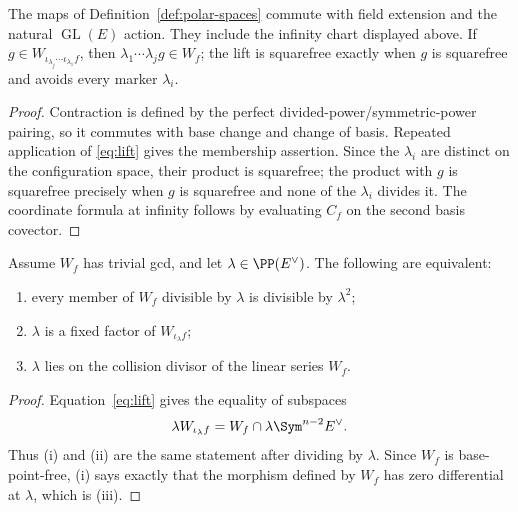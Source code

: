 \begin{theorem}\label{supp:thm:polar-construction}%
%
%
The maps of Definition~\ref{def:polar-spaces} commute with field
extension and the natural $\operatorname{GL}(E)$ action.  They include
the infinity chart displayed above.  If
$g\in W_{\iota_{\lambda_j}\cdots\iota_{\lambda_1}f}$, then
$\lambda_1\cdots\lambda_jg\in W_f$; the lift is squarefree exactly
when $g$ is squarefree and avoids every marker $\lambda_i$.
\end{theorem}

\begin{proof}
Contraction is defined by the perfect divided-power/symmetric-power
pairing, so it commutes with base change and change of basis.  Repeated
application of \eqref{eq:lift} gives the membership assertion.  Since
the $\lambda_i$ are distinct on the configuration space, their product
is squarefree; the product with $g$ is squarefree precisely when $g$
is squarefree and none of the $\lambda_i$ divides it.  The coordinate
formula at infinity follows by evaluating $C_f$ on the second basis
covector.
\end{proof}

\begin{lemma}
\label{supp:lem:marker-collision}%
%
Assume \(W_f\) has trivial gcd, and let \(\lambda\in\PP(E^\vee)\).
The following are equivalent:
\begin{enumerate}[label=\textup{(\roman*)}]
\item every member of \(W_f\) divisible by \(\lambda\) is divisible
  by \(\lambda^2\);
\item \(\lambda\) is a fixed factor of \(W_{\iota_\lambda f}\);
\item \(\lambda\) lies on the collision divisor of the linear series
  \(W_f\).
\end{enumerate}
\end{lemma}

\begin{proof}
Equation~\eqref{eq:lift} gives the equality of subspaces
\[
 \lambda W_{\iota_\lambda f}
 =W_f\cap\lambda\Sym^{n-2}E^\vee.
\]
Thus (i) and (ii) are the same statement after dividing by
\(\lambda\).  Since \(W_f\) is base-point-free, (i) says exactly that
the morphism defined by \(W_f\) has zero differential at \(\lambda\),
which is (iii).
\end{proof}

